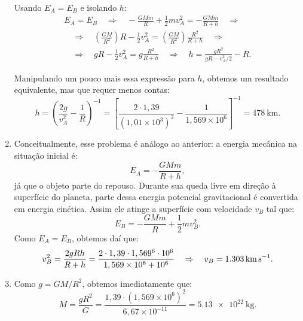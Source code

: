 \documentclass[a4paper]{article}
\newcommand\myrightarrow{\quad\Rightarrow\quad}
\begin{document}
\begin{resolucoes}
\begin{exercicio}
\begin{enumerate}
  Usando $E_A = E_B$ e isolando $h$:
  \begin{gather*}
  E_A = E_B \myrightarrow -\frac{GMm}{R} + \frac{1}{2}mv_A^2 = -\frac{GMm}{R+h} \myrightarrow\\
  \myrightarrow\left(\frac{GM}{R^2}\right)R - \frac{1}{2}v_A^2 = \left(\frac{GM}{R^2}\right)\frac{R^2}{R+h} \myrightarrow\\
  \myrightarrow gR - \frac{1}{2}v_A^2 = g\frac{R^2}{R+h} \myrightarrow h = \frac{gR^2}{gR-v_A^2/2}-R.
  \end{gather*}
  
  Manipulando um pouco mais essa expressão para $h$, obtemos um resultado equivalente, mas que requer menos contas:
  \begin{equation*}
  h = \left(\frac{2g}{v_A^2} - \frac{1}{R}\right)^{-1} = \left[\frac{2\cdot 1,39}{\left(1,01\times10^{3}\right)^2} - \frac{1}{1,569\times10^{6}}\right]^{-1} = \SI{478}{\kilo\metre}.
  \end{equation*}

  \item Conceitualmente, esse problema é análogo ao anterior: a energia mecânica na situação inicial é:
  \begin{equation*}
  E_A = -\frac{GMm}{R+h},
  \end{equation*}
  já que o objeto parte do repouso.
  Durante sua queda livre em direção à superfície do planeta, parte dessa energia potencial gravitacional é convertida em energia cinética.
  Assim ele atinge a superfície com velocidade $v_B$ tal que:
  \begin{equation*}
  E_B = -\frac{GMm}{R} + \frac{1}{2}mv_B^2.
  \end{equation*}
  Como $E_A = E_B$, obtemos daí que:
  \begin{equation*}
  v_B^2 = \frac{2gRh}{R+h} = \frac{2\cdot1,39\cdot1,569\time10^{6}\cdot10^6}{1,569\times10^{6}+10^{6}} \myrightarrow v_B = \SI{1.303}{\kilo\metre\per\second}.
  \end{equation*}

  \item Como $g=GM/R^2$, obtemos imediatamente que:
  \begin{equation*}
  M = \frac{gR^2}{G} = \frac{1,39\cdot \left(1,569\times10^{6}\right)^2}{6,67\times10^{-11}} = \SI{5.13e22}{\kilo\gram}.
  \end{equation*}
  
  \end{enumerate}
  \end{exercicio}
  

\end{resolucoes}
\end{document}
